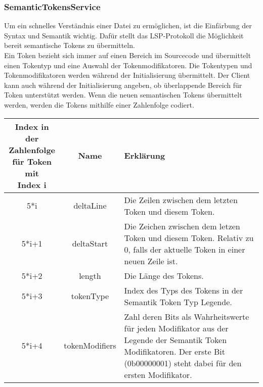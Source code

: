 \documentclass[./einleitung.tex]{subfiles}
\begin{document}
    \subsubsection{SemanticTokensService}
    Um ein schnelles Verständnis einer Datei zu ermöglichen, ist die Einfärbung der Syntax und Semantik wichtig.
    Dafür stellt das LSP-Protokoll die Möglichkeit bereit semantische Tokens zu übermitteln.\\
    Ein Token bezieht sich immer auf einen Bereich im Sourcecode und übermittelt einen Tokentyp und eine Auswahl der Tokenmodifikatoren.
    Die Tokentypen und Tokenmodifikatoren werden während der Initialisierung übermittelt.
    Der Client kann auch während der Initialisierung angeben, ob überlappende Bereich für Token unterstützt werden.
    Wenn die neuen semantischen Tokens übermittelt werden, werden die Tokens mithilfe einer Zahlenfolge codiert.
    \begin{center}
        \begin{tabular}{| c | c | m{21.5em} |}
            \hline
            \makecell{Index in der\\ Zahlenfolge\\für Token mit \\Index i} & Name & Erklärung \\
            \hline
            5*i & deltaLine & Die Zeilen zwischen dem letzten Token und diesem Token. \\
            \hline
            5*i+1 & deltaStart & Die Zeichen zwischen dem letzen Token und diesem Token.
            Relativ zu 0, falls der aktuelle Token in einer neuen Zeile ist. \\
            \hline
            5*i+2 & length & Die Länge des Tokens. \\
            \hline
            5*i+3 & tokenType & Index des Typs des Tokens in der Semantik Token Typ Legende. \\
            \hline
            5*i+4 & tokenModifiers & Zahl deren Bits als Wahrheitswerte für jeden Modifikator aus der Legende der Semantik Token Modifikatoren.
            Der erste Bit (0b00000001) steht dabei für den ersten Modifikator. \\
            \hline
        \end{tabular}
    \end{center}
\end{document}
